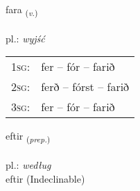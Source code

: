 \documentclass[frontgrid, backgrid]{flacards}\usepackage[]{graphicx}\usepackage[]{xcolor}
\begin{document}
\renewcommand{\flhead}{\vskip5pt \fboxsep=0pt {\small\bfseries\footnotesize Sagnorð | czasownik}}
\renewcommand{\fcfoot}{\vskip5pt \fboxsep=0pt \hspace{2pt}{\small\bfseries\footnotesize 1K}}

\renewcommand{\blhead}{\vskip5pt {\small\bfseries\footnotesize Sagnorð | czasownik }}
\renewcommand{\bcfoot}{\vskip5pt \hspace{2pt}{\small\bfseries\footnotesize 1K}}


{fara \small{\textsubscript{(\textit{v.})}} \\[1ex] %
\textphonetic{[faːra]} \\
pl.: \emph{wyjść} \\  [2ex]
\renewcommand*{\arraystretch}{0.8}
\begin{tabular}{p{1cm}l}
\textsc{1sg}: & fer -- fór -- farið \\ 
\textsc{2sg}: & ferð -- fórst -- farið \\ 
\textsc{3sg}: & fer -- fór -- farið \\ 
\end{tabular}
}


\renewcommand{\flhead}{\vskip5pt \fboxsep=0pt {\small\bfseries\footnotesize Forsetning | przyimek}}
\renewcommand{\fcfoot}{\vskip5pt \fboxsep=0pt \hspace{2pt}{\small\bfseries\footnotesize 1K}}

\renewcommand{\blhead}{\vskip5pt {\small\bfseries\footnotesize Forsetning | przyimek }}
\renewcommand{\bcfoot}{\vskip5pt \hspace{2pt}{\small\bfseries\footnotesize 1K}}


{eftir \small{\textsubscript{(\textit{prep.})}} \\[1ex]
\textphonetic{[ɛftɪr]} \\
pl.: \emph{według} \\  [2ex]
eftir (Indeclinable)}

\renewcommand{\flhead}{\vskip5pt \fboxsep=0pt {\small\bfseries\footnotesize Sagnorð | czasownik}}
\renewcommand{\fcfoot}{\vskip5pt \fboxsep=0pt \hspace{2pt}{\small\bfseries\footnotesize 1K}}
\end{document}
